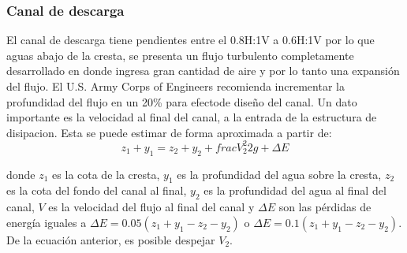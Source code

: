 \documentclass[11pt, oneside]{article}
\begin{document}
\subsubsection{Canal de descarga}
El canal de descarga tiene pendientes entre el 0.8H:1V a 0.6H:1V por lo que aguas abajo de la cresta, se presenta un flujo turbulento completamente desarrollado en donde ingresa gran cantidad de aire y por lo tanto una expansi\'on del flujo. El U.S. Army Corps of Engineers recomienda incrementar la profundidad del flujo en un 20\% para efectode diseño del canal. Un dato importante es la velocidad al final del canal, a la entrada de la estructura de disipacion. Esta se puede estimar de forma aproximada a partir de:
\begin{equation}
    z_1 + y_1 = z_2 + y_2 + frac{V_2^2}{2g} + \Delta E
    \label{eq28}
\end{equation}

donde $z_1$ es la cota de la cresta, $y_1$ es la profundidad del agua sobre la cresta, $z_2$ es la cota del fondo del canal al final, $y_2$ es la profundidad del agua al final del canal, $V$ es la velocidad del flujo al final del canal y $\Delta E$ son las p\'erdidas de energ\'ia iguales a $\Delta E = 0.05\left(z_1 + y_1 - z_2 - y_2\right)$ o $\Delta E = 0.1\left(z_1 + y_1 - z_2 - y_2\right)$. De la ecuaci\'on anterior, es posible despejar $V_2$.


\end{document}
